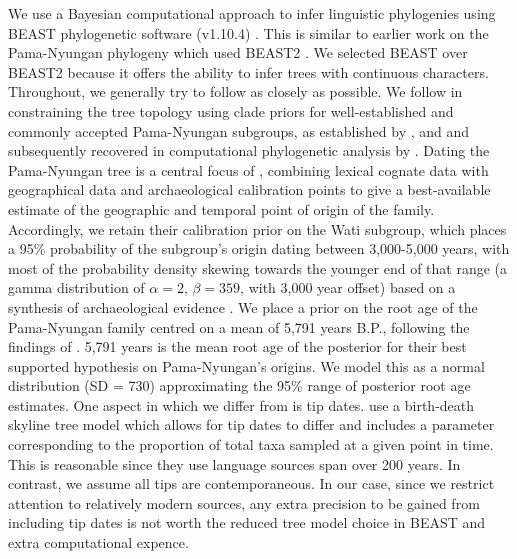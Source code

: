 \documentclass[]{article}
\begin{document}
We use a Bayesian computational approach to infer linguistic phylogenies using BEAST phylogenetic software (v1.10.4) \autocite{suchard_bayesian_2018}. This is similar to earlier work on the Pama-Nyungan phylogeny \autocites{bowern_computational_2012}{bouckaert_origin_2018} which used BEAST2 \autocite{bouckaert_beast_2019}. We selected BEAST over BEAST2 because it offers the ability to infer trees with continuous characters. Throughout, we generally try to follow \textcite{bouckaert_origin_2018} as closely as possible. We follow \textcite{bouckaert_origin_2018} in constraining the tree topology using clade priors for well-established and commonly accepted Pama-Nyungan subgroups, as established by \textcite{ogrady_languages_1966}, \textcite{muhlhausler_atlas_1996} and \textcite{koch_languages_2014} and subsequently recovered in computational phylogenetic analysis by \textcite{bowern_computational_2012}. Dating the Pama-Nyungan tree is a central focus of \textcite{bouckaert_origin_2018}, combining lexical cognate data with geographical data and archaeological calibration points to give a best-available estimate of the geographic and temporal point of origin of the family. Accordingly, we retain their calibration prior on the Wati subgroup, which places a 95\% probability of the subgroup's origin dating between 3,000-5,000 years, with most of the probability density skewing towards the younger end of that range (a gamma distribution of \(\alpha = 2\), \(\beta = 359\), with 3,000 year offset) based on a synthesis of archaeological evidence \autocite[see][p.~746]{bouckaert_origin_2018}. We place a prior on the root age of the Pama-Nyungan family centred on a mean of 5,791 years B.P., following the findings of \textcite{bouckaert_origin_2018}. 5,791 years is the mean root age of the posterior for their best supported hypothesis on Pama-Nyungan's origins. We model this as a normal distribution (SD = 730) approximating the 95\% range of posterior root age estimates. One aspect in which we differ from \textcite{bouckaert_origin_2018} is tip dates. \textcite{bouckaert_origin_2018} use a birth-death skyline tree model which allows for tip dates to differ and includes a parameter corresponding to the proportion of total taxa sampled at a given point in time. This is reasonable since they use language sources span over 200 years. In contrast, we assume all tips are contemporaneous. In our case, since we restrict attention to relatively modern sources, any extra precision to be gained from including tip dates is not worth the reduced tree model choice in BEAST and extra computational expence.
\end{document}
